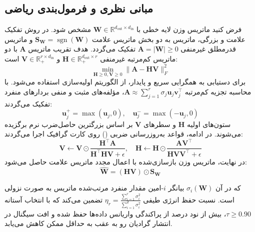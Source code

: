 \subsection{مبانی نظری و فرمول‌بندی ریاضی}
فرض کنید ماتریس وزن لایه خطی با $\mathbf{W} \in \mathbb{R}^{d_{\text{out}} \times d_{\text{in}}}$ مشخص شود. در روش تفکیک علامت و بزرگی، ماتریس به دو بخش ماتریس علامت $\mathbf{S}_{\mathbf{W}} = \operatorname{sgn}(\mathbf{W})$ و ماتریس قدرمطلق غیرمنفی $\mathbf{A} = |\mathbf{W}| \ge 0$ تفکیک می‌گردد. هدف  تقریب ماتریس $\mathbf{A}$ با دو ماتریس کم‌مرتبه غیرمنفی $\mathbf{H} \in \mathbb{R}_{+}^{d_{\text{out}} \times r}$ و $\mathbf{V} \in \mathbb{R}_{+}^{r \times d_{\text{in}}}$ است:
\begin{equation}
\min_{\mathbf{H} \ge 0, \mathbf{V} \ge 0} \|\mathbf{A} - \mathbf{H}\mathbf{V}\|_F^2
\end{equation}
برای دستیابی به همگرایی سریع و پایدار، از الگوریتم اولیه‌سازی  استفاده می‌شود. با محاسبه تجزیه کم‌مرتبه $\mathbf{A} \approx \sum_{j=1}^r \sigma_j \mathbf{u}_j \mathbf{v}_j^\top$، مؤلفه‌های مثبت و منفی بردارهای منفرد تفکیک می‌گردند:
\begin{equation}
\mathbf{u}_j^+ = \max(\mathbf{u}_j, 0), \quad \mathbf{u}_j^- = \max(-\mathbf{u}_j, 0)
\end{equation}
ستون‌های اولیه $\mathbf{H}$ و سطرهای $\mathbf{V}$ بر اساس بزرگترین حاصل‌ضرب نرم برگزیده می‌شوند. در ادامه، قواعد به‌روزرسانی ضربی () روی کارت گرافیک اجرا می‌گردند:
\begin{equation}
\mathbf{V} \leftarrow \mathbf{V} \odot \frac{\mathbf{H}^\top \mathbf{A}}{\mathbf{H}^\top \mathbf{H} \mathbf{V} + \epsilon}, \quad \mathbf{H} \leftarrow \mathbf{H} \odot \frac{\mathbf{A} \mathbf{V}^\top}{\mathbf{H} \mathbf{V} \mathbf{V}^\top + \epsilon}
\end{equation}
در نهایت، ماتریس وزن بازسازی‌شده با اعمال مجدد ماتریس علامت حاصل می‌شود:
\begin{equation}
\hat{\mathbf{W}} = (\mathbf{H}\mathbf{V}) \odot \mathbf{S}_{\mathbf{W}}
\end{equation}

که در آن $\sigma_i(\mathbf{W})$ بیانگر $i$-امین مقدار منفرد مرتب‌شده ماتریس به صورت نزولی است. نسبت حفظ انرژی طیفی $\eta_r = \frac{\sum_{i=1}^r \sigma_i^2}{\sum_{i=1}^{d} \sigma_i^2}$ تضمین می‌کند که با انتخاب آستانه $\tau \ge 0.90$، بیش از نود درصد از پراکندگی واریانس داده‌ها حفظ شده و افت سیگنال در انتشار گرادیان رو به عقب به حداقل ممکن کاهش می‌یابد.

